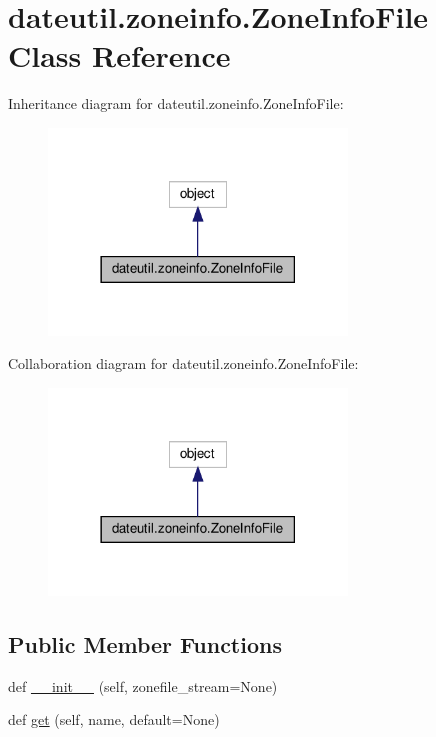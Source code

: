 \hypertarget{classdateutil_1_1zoneinfo_1_1ZoneInfoFile}{}\section{dateutil.\+zoneinfo.\+Zone\+Info\+File Class Reference}
\label{classdateutil_1_1zoneinfo_1_1ZoneInfoFile}


Inheritance diagram for dateutil.\+zoneinfo.\+Zone\+Info\+File\+:
\nopagebreak
\begin{figure}[H]
\begin{center}
\leavevmode
\includegraphics[width=225pt]{classdateutil_1_1zoneinfo_1_1ZoneInfoFile__inherit__graph}
\end{center}
\end{figure}


Collaboration diagram for dateutil.\+zoneinfo.\+Zone\+Info\+File\+:
\nopagebreak
\begin{figure}[H]
\begin{center}
\leavevmode
\includegraphics[width=225pt]{classdateutil_1_1zoneinfo_1_1ZoneInfoFile__coll__graph}
\end{center}
\end{figure}
\subsection*{Public Member Functions}
\begin{DoxyCompactItemize}
\item 
def \hyperlink{classdateutil_1_1zoneinfo_1_1ZoneInfoFile_a279a7e2a3485ef6b7b09131401f37b74}{\+\_\+\+\_\+init\+\_\+\+\_\+} (self, zonefile\+\_\+stream=None)
\item 
def \hyperlink{classdateutil_1_1zoneinfo_1_1ZoneInfoFile_a0860a277d5a39b674d5bd527da092710}{get} (self, name, default=None)
\end{DoxyCompactItemize}

